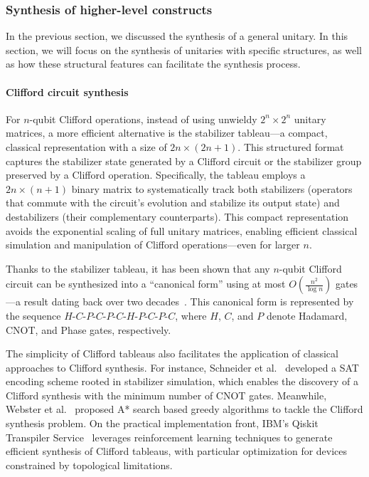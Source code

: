 \documentclass[a4paper,onecolumn,11pt,unpublished]{quantumarticle}
\begin{document}
\subsubsection{Synthesis of higher-level constructs}\label{subsubsec:synth_highlevel}
In the previous section, we discussed the synthesis of a general unitary. In this section, we will focus on the synthesis of unitaries with specific structures, as well as how these structural features can facilitate the synthesis process.

\paragraph{Clifford circuit synthesis}
For $n$-qubit Clifford operations, instead of using unwieldy $2^n \times 2^n$ unitary matrices, a more efficient alternative is the stabilizer tableau---a compact, classical representation with a size of $2n \times (2n+1)$. This structured format captures the stabilizer state generated by a Clifford circuit or the stabilizer group preserved by a Clifford operation.  Specifically, the tableau employs a $2n \times (n+1)$ binary matrix to systematically track both stabilizers (operators that commute with the circuit's evolution and stabilize its output state) and destabilizers (their complementary counterparts). This compact representation avoids the exponential scaling of full unitary matrices, enabling efficient classical simulation and manipulation of Clifford operations---even for larger $n$. 

Thanks to the stabilizer tableau, it has been shown that any $ n $-qubit Clifford circuit can be synthesized into a ``canonical form'' using at most $O(\frac{n^2}{\log n})$ gates---a result dating back over two decades~\cite{PhysRevA.70.052328}. This canonical form is represented by the sequence $H$-$C$-$P$-$C$-$P$-$C$-$H$-$P$-$C$-$P$-$C$, where $H$, $C$, and $P$ denote Hadamard, CNOT, and Phase gates, respectively.


The simplicity of Clifford tableaus also facilitates the application of classical approaches to Clifford synthesis. For instance, Schneider et al.~\cite{Schneider2023SATClifford} developed a SAT encoding scheme rooted in stabilizer simulation, which enables the discovery of a Clifford synthesis with the minimum number of CNOT gates. Meanwhile, Webster et al.~\cite{websterHeuristicOptimalSynthesis2025} proposed A* search based greedy algorithms to tackle the Clifford synthesis problem. On the practical implementation front, IBM's Qiskit Transpiler Service~\cite{kremerPracticalEfficientQuantum2024} leverages reinforcement learning techniques to generate efficient synthesis of Clifford tableaus, with particular optimization for devices constrained by topological limitations.
\end{document}
